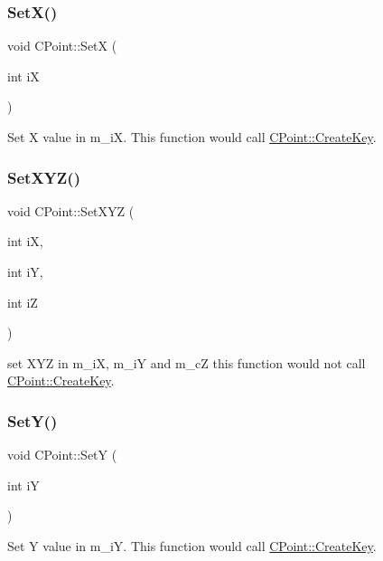 \subsubsection{\texorpdfstring{SetX()}{SetX()}}
{\footnotesize\ttfamily void C\+Point\+::\+SetX (\begin{DoxyParamCaption}\item[{int}]{iX }\end{DoxyParamCaption})}

Set X value in m\+\_\+iX. This function would call \mbox{\hyperlink{classCPoint_adff246311a759e9c7eaa5f5374dd3643}{C\+Point\+::\+Create\+Key}}. \mbox{\label{classCPoint_ae8364b4fc6b31f4a844f38a13f2251c7}} 
\subsubsection{\texorpdfstring{SetXYZ()}{SetXYZ()}}
{\footnotesize\ttfamily void C\+Point\+::\+Set\+X\+YZ (\begin{DoxyParamCaption}\item[{int}]{iX,  }\item[{int}]{iY,  }\item[{int}]{iZ }\end{DoxyParamCaption})}

set X\+YZ in m\+\_\+iX, m\+\_\+iY and m\+\_\+cZ this function would not call \mbox{\hyperlink{classCPoint_adff246311a759e9c7eaa5f5374dd3643}{C\+Point\+::\+Create\+Key}}. \mbox{\label{classCPoint_a984d81a6620d3bcf3df8dc14c42f2a1d}} 
\subsubsection{\texorpdfstring{SetY()}{SetY()}}
{\footnotesize\ttfamily void C\+Point\+::\+SetY (\begin{DoxyParamCaption}\item[{int}]{iY }\end{DoxyParamCaption})}

Set Y value in m\+\_\+iY. This function would call \mbox{\hyperlink{classCPoint_adff246311a759e9c7eaa5f5374dd3643}{C\+Point\+::\+Create\+Key}}. \mbox{\label{classCPoint_abc4fb18e1e3ca6545e6f6e4c7cb0e555}} 
